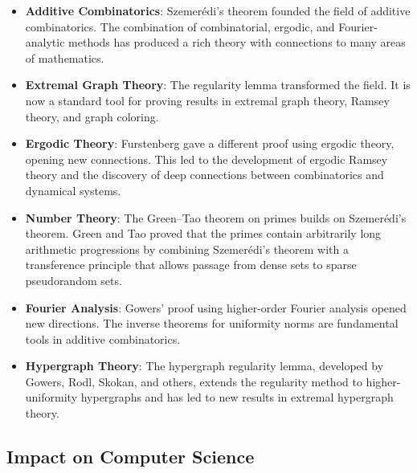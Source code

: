 \begin{itemize}
\item \textbf{Additive Combinatorics}: Szemer\'edi's theorem founded the field of additive combinatorics. The combination of combinatorial, ergodic, and Fourier-analytic methods has produced a rich theory with connections to many areas of mathematics.
\item \textbf{Extremal Graph Theory}: The regularity lemma transformed the field. It is now a standard tool for proving results in extremal graph theory, Ramsey theory, and graph coloring.
\item \textbf{Ergodic Theory}: Furstenberg gave a different proof using ergodic theory, opening new connections. This led to the development of ergodic Ramsey theory and the discovery of deep connections between combinatorics and dynamical systems.
\item \textbf{Number Theory}: The Green--Tao theorem on primes builds on Szemer\'edi's theorem. Green and Tao proved that the primes contain arbitrarily long arithmetic progressions by combining Szemer\'edi's theorem with a transference principle that allows passage from dense sets to sparse pseudorandom sets.
\item \textbf{Fourier Analysis}: Gowers' proof using higher-order Fourier analysis opened new directions. The inverse theorems for uniformity norms are fundamental tools in additive combinatorics.
\item \textbf{Hypergraph Theory}: The hypergraph regularity lemma, developed by Gowers, Rodl, Skokan, and others, extends the regularity method to higher-uniformity hypergraphs and has led to new results in extremal hypergraph theory.
\end{itemize}

\subsection{Impact on Computer Science}

